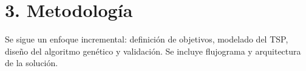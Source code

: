 \section*{3. Metodología}
Se sigue un enfoque incremental: definición de objetivos, modelado del TSP, diseño del algoritmo genético y validación. Se incluye flujograma y arquitectura de la solución.
